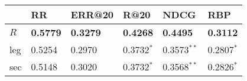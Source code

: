 \begin{tabular}{llllll}
\toprule
{} &               RR &           ERR@20 &             R@20 &             NDCG &              RBP \\
\midrule
$R$ &  \textbf{0.5779} &  \textbf{0.3279} &  \textbf{0.4268} &  \textbf{0.4495} &  \textbf{0.3112} \\
leg &           0.5254 &           0.2970 &     0.3732$^{*}$ &    0.3573$^{**}$ &     0.2807$^{*}$ \\
sec &           0.5148 &           0.3020 &     0.3732$^{*}$ &    0.3568$^{**}$ &     0.2826$^{*}$ \\
\bottomrule
\end{tabular}
